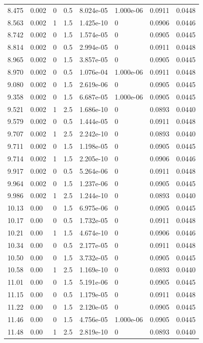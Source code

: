 \documentclass[preview]{standalone}
\begin{document}
{{{\begin{tabular}{L{1.2cm}C{1.2cm} C{0.3cm}C{0.5cm} C{1.4cm}C{1.4cm} C{1.4cm}C{1.4cm}}
  8.475  &  0.002  & 0     & 0.5 &  8.024e-05  & 1.000e-06  & 0.0911 &  0.0448   \\ 
  8.563  &  0.002  & 1     & 1.5 &  1.425e-10  & 0  & 0.0906 &  0.0446   \\ 
  8.742  &  0.002  & 0     & 1.5 &  1.574e-05  & 0  & 0.0905 &  0.0445   \\ 
  8.814  &  0.002  & 0     & 0.5 &  2.994e-05  & 0  & 0.0911 &  0.0448   \\ 
  8.965  &  0.002  & 0     & 1.5 &  3.857e-05  & 0  & 0.0905 &  0.0445   \\ 
  8.970  &  0.002  & 0     & 0.5 &  1.076e-04  & 1.000e-06  & 0.0911 &  0.0448   \\ 
  9.080  &  0.002  & 0     & 1.5 &  2.619e-06  & 0  & 0.0905 &  0.0445   \\ 
  9.358  &  0.002  & 0     & 1.5 &  6.687e-05  & 1.000e-06  & 0.0905 &  0.0445   \\ 
  9.521  &  0.002  & 1     & 2.5 &  1.686e-10  & 0  & 0.0893 &  0.0440   \\ 
  9.579  &  0.002  & 0     & 0.5 &  1.444e-05  & 0  & 0.0911 &  0.0448   \\ 
  9.707  &  0.002  & 1     & 2.5 &  2.242e-10  & 0  & 0.0893 &  0.0440   \\ 
  9.711  &  0.002  & 0     & 1.5 &  1.198e-05  & 0  & 0.0905 &  0.0445   \\ 
  9.714  &  0.002  & 1     & 1.5 &  2.205e-10  & 0  & 0.0906 &  0.0446   \\ 
  9.917  &  0.002  & 0     & 0.5 &  5.264e-06  & 0  & 0.0911 &  0.0448   \\ 
  9.964  &  0.002  & 0     & 1.5 &  1.237e-06  & 0  & 0.0905 &  0.0445   \\ 
  9.986  &  0.002  & 1     & 2.5 &  1.244e-10  & 0  & 0.0893 &  0.0440   \\ 
  10.13  &  0.00  & 0     & 1.5 &  6.975e-06  & 0  & 0.0905 &  0.0445   \\ 
  10.17  &  0.00  & 0     & 0.5 &  1.732e-05  & 0  & 0.0911 &  0.0448   \\ 
  10.21  &  0.00  & 1     & 1.5 &  4.674e-10  & 0  & 0.0906 &  0.0446   \\ 
  10.34  &  0.00  & 0     & 0.5 &  2.177e-05  & 0  & 0.0911 &  0.0448   \\ 
  10.50  &  0.00  & 0     & 1.5 &  3.732e-05  & 0  & 0.0905 &  0.0445   \\ 
  10.58  &  0.00  & 1     & 2.5 &  1.169e-10  & 0  & 0.0893 &  0.0440   \\ 
  11.01  &  0.00  & 0     & 1.5 &  5.191e-06  & 0  & 0.0905 &  0.0445   \\ 
  11.15  &  0.00  & 0     & 0.5 &  1.179e-05  & 0  & 0.0911 &  0.0448   \\ 
  11.22  &  0.00  & 0     & 1.5 &  2.120e-05  & 0  & 0.0905 &  0.0445   \\ 
  11.46  &  0.00  & 0     & 1.5 &  4.756e-05  & 1.000e-06  & 0.0905 &  0.0445   \\ 
  11.48  &  0.00  & 1     & 2.5 &  2.819e-10  & 0  & 0.0893 &  0.0440   \\ 
\hline 
\end{tabular} 

}}}
\end{document}
